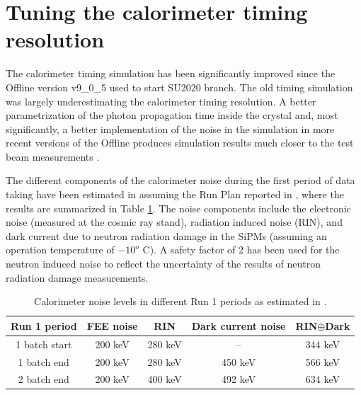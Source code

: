 
\section{Tuning the calorimeter timing resolution}

The calorimeter timing simulation has been significantly improved since the Offline version
v9\_0\_5 used to start SU2020 branch.
The old timing simulation was largely underestimating the calorimeter timing resolution.
A better parametrization of the photon propagation time inside the crystal and, most significantly, a better implementation of the noise in the simulation in more recent versions of the Offline produces  simulation results much closer to the test beam measurements \cite{MU2E_35540_CALO_TIMING}.

The different components of the calorimeter noise during the first period of data taking have been estimated in \cite{MU2E_35519_CALO_NOISE} 
assuming the Run Plan reported in \cite{MU2E_33731_RUN1_PLAN}, where the results are summarized
in Table \ref{table:calonoise}. 
The noise components include the electronic noise (measured at the cosmic ray stand), 
radiation induced noise (RIN), and dark current due to neutron radiation damage
in the SiPMs (assuming an operation temperature of $-10^o$ C).
A safety factor of 2 has been used for the  neutron induced noise to reflect the uncertainty of the results of neutron radiation damage measurements.

\begin{table}[htbp]
  \begin{center} 
    \begin{tabular}{|c|c|c|c|c|}
      \hline
      Run 1 period      & FEE noise  & RIN     & Dark current noise & RIN$\oplus$Dark    \\ 
      \hline
      1 batch start     & 200 keV    & 280 keV &  --                & 344 keV  \\
      1 batch end       & 200 keV    & 280 keV &  450 keV           & 566 keV  \\
      2 batch end       & 200 keV    & 400 keV &  492 keV           & 634 keV  \\
      \hline
    \end{tabular}
  \end{center}
  \caption{
  \label{table:calonoise}
    Calorimeter noise levels in different Run 1 periods as estimated in \cite{MU2E_35519_CALO_NOISE}. 
  }
\end{table}

